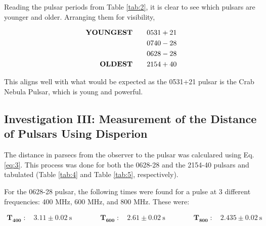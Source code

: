 \documentclass[12pt]{article}
\begin{document}
Reading the pulsar periods from Table \ref{tab:2}, it is clear to see which pulsars are younger and older. Arranging them for visibility,

\vspace{-2ex}
\[
\begin{aligned}
\text{\textbf{YOUNGEST}} \qquad & 0531+21 \\
& 0740-28 \\
& 0628-28 \\
\text{\textbf{OLDEST}} \qquad & 2154+40
\end{aligned}
\]

This aligns well with what would be expected as the 0531+21 pulsar is the Crab Nebula Pulsar, which is young and powerful.

\vspace{1cm}
\subsection{Investigation III: Measurement of the Distance of Pulsars Using Disperion}

The distance in parsecs from the observer to the pulsar was calculared using Eq. \ref{eq:3}. This process was done for both the 0628-28 and the 2154-40 pulsars and tabulated (Table \ref{tab:4} and Table \ref{tab:5}, respectively).

For the 0628-28 pulsar, the following times were found for a pulse at 3 different frequencies: 400 MHz, 600 MHz, and 800 MHz. These were:

\vspace{-2ex}
\begin{gather*}
    \mathbf{T_{400}} \; : \quad 3.11 \pm 0.02 \:\text{s} \qquad\qquad \mathbf{T_{600}} \; : \quad 2.61 \pm 0.02 \:\text{s} \qquad\qquad \mathbf{T_{800}} \; : \quad 2.435 \pm 0.02 \:\text{s}
\end{gather*}
\end{document}
